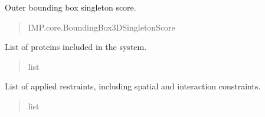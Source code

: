 \documentclass[letterpaper,10pt,english]{sphinxmanual}
\begin{document}
\begin{fulllineitems}
\begin{fulllineitems}
\begin{quote}
\begin{description}
\end{description}\end{quote}

\end{fulllineitems}


\begin{fulllineitems}
\label{\detokenize{src:src.System_Class.System.outer_bbss}}
\pysigstartsignatures
{}
\pysigstopsignatures
\sphinxAtStartPar
Outer bounding box singleton score.
\begin{quote}\begin{description}
\sphinxAtStartPar
IMP.core.BoundingBox3DSingletonScore

\end{description}\end{quote}

\end{fulllineitems}


\begin{fulllineitems}
\label{\detokenize{src:src.System_Class.System.proteins}}
\pysigstartsignatures
{}
\pysigstopsignatures
\sphinxAtStartPar
List of proteins included in the system.
\begin{quote}\begin{description}
\sphinxAtStartPar
list

\end{description}\end{quote}

\end{fulllineitems}


\begin{fulllineitems}
\label{\detokenize{src:src.System_Class.System.restraints}}
\pysigstartsignatures
{}
\pysigstopsignatures
\sphinxAtStartPar
List of applied restraints, including spatial and interaction constraints.
\begin{quote}\begin{description}
\sphinxAtStartPar
list


\end{description}
\end{quote}
\end{fulllineitems}
\end{fulllineitems}
\end{document}
